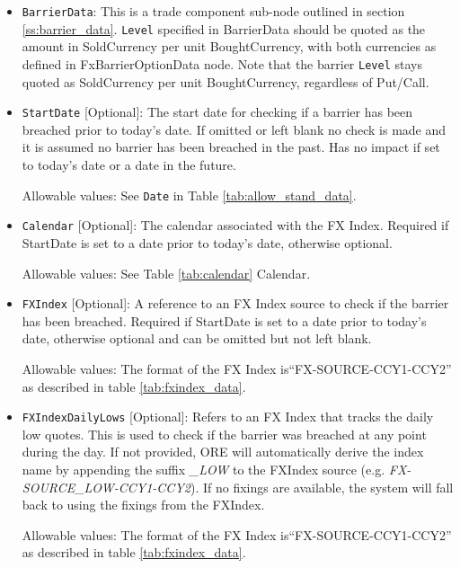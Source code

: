 \begin{itemize}
\begin{itemize}
\end{itemize}



\item \lstinline!BarrierData!: This is a trade component sub-node outlined in section \ref{ss:barrier_data}.
\lstinline!Level! specified in BarrierData should be quoted as the amount in SoldCurrency per unit BoughtCurrency, with both currencies as defined in FxBarrierOptionData node.
Note that the barrier  \lstinline!Level! stays quoted as SoldCurrency per unit BoughtCurrency, regardless of Put/Call.

\item \lstinline!StartDate! [Optional]: The start date for checking if a barrier has been breached prior to today's date.  If omitted or left blank no check is made and it is assumed no barrier has been breached in the past. Has no impact if set to today's date or a date in the future.

Allowable values:  See \lstinline!Date! in Table \ref{tab:allow_stand_data}.

\item \lstinline!Calendar! [Optional]: The calendar associated with the FX Index. Required if StartDate is set to a date prior to today's date, otherwise optional.

Allowable values: See Table \ref{tab:calendar} Calendar.

\item \lstinline!FXIndex! [Optional]: A reference to an FX Index source to check if the barrier has been breached. Required if StartDate is set to a date prior to today's date, otherwise optional and can be omitted but not left blank.

Allowable values:  The format of the FX Index is``FX-SOURCE-CCY1-CCY2'' as described in table \ref{tab:fxindex_data}. 

\item \lstinline!FXIndexDailyLows! [Optional]: Refers to an FX Index that tracks the daily low quotes. This is used to check if the barrier was breached at any point during the day. If not provided, ORE will automatically derive the index name by appending the suffix \emph{\_LOW} to the FXIndex source (e.g. \emph{FX-SOURCE\_LOW-CCY1-CCY2}). If no fixings are available, the system will fall back to using the fixings from the FXIndex.

Allowable values:  The format of the FX Index is``FX-SOURCE-CCY1-CCY2'' as described in table \ref{tab:fxindex_data}.  


\end{itemize}
